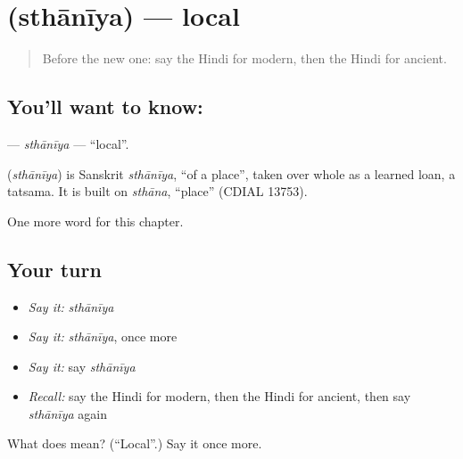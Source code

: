 \section[\texorpdfstring{\hi{स्थानीय} (sthānīya)}{स्थानीय (sthānīya)}]{ (sthānīya) — local}

\label{lesson:HI-C240-sthaniya}



\begin{quote}
Before the new one: say the Hindi for modern, then the Hindi for ancient.
\end{quote}

\subsection*{You'll want to know: }
\textbf{} — \emph{sthānīya} — \textquotedblleft{}local\textquotedblright{}.

\begin{cousinweb}
\textbf{} (\emph{sthānīya}) is Sanskrit \emph{sthānīya}, \textquotedblleft{}of a place\textquotedblright{}, taken over whole as a learned loan, a tatsama. It is built on \emph{sthāna}, \textquotedblleft{}place\textquotedblright{} (CDIAL 13753).
\end{cousinweb}

\begin{grammarlens}[title={What you've built}]
One more word for this chapter.
\end{grammarlens}

\subsection*{Your turn}
\begin{itemize}
\raggedright
  \item \emph{Say it:} \emph{sthānīya}
  \item \emph{Say it:} \emph{sthānīya}, once more
  \item \emph{Say it:} say \emph{sthānīya}
  \item \emph{Recall:} say the Hindi for modern, then the Hindi for ancient, then say \emph{sthānīya} again
\end{itemize}

\begin{tcolorbox}[breakable,colback=teal!4,colframe=teal!35!black,title={Before you move on}]
What does  mean? (\textquotedblleft{}Local\textquotedblright{}.) Say it once more.
\end{tcolorbox}
